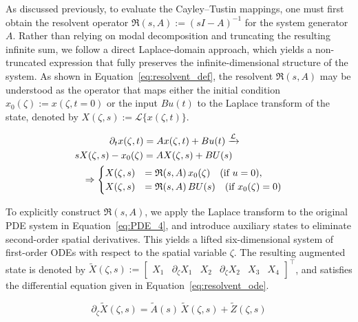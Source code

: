As discussed previously, to evaluate the Cayley--Tustin mappings, one must first obtain the resolvent operator $\mathfrak{R}(s, A) := (sI - A)^{-1}$ for the system generator $A$. Rather than relying on modal decomposition and truncating the resulting infinite sum, we follow a direct Laplace-domain approach\autocite{Khatibi2021Model, Moadeli2025Model}, which yields a non-truncated expression that fully preserves the infinite-dimensional structure of the system. As shown in Equation~\eqref{eq:resolvent_def}, the resolvent $\mathfrak{R}(s, A)$ may be understood as the operator that maps either the initial condition $x_0(\zeta) := x(\zeta, t=0)$ or the input $B u(t)$ to the Laplace transform of the state, denoted by $X(\zeta, s) := \mathcal{L}\{x(\zeta, t)\}$.


\begin{equation} \label{eq:resolvent_def}
\begin{aligned}
    &\hspace{3.6em}\partial_t x(\zeta, t) = A x(\zeta, t) + B u(t) \xrightarrow{\mathcal{L}} \\
    &s X(\zeta, s) - x_0(\zeta) = A X(\zeta, s) + B U(s) \\
    &\hspace{0.8em}\Rightarrow \begin{cases}
        X(\zeta, s) &= \mathfrak{R}(s, A)\, x_0(\zeta) \quad \text{(if $u = 0$)}, \\
        X(\zeta, s) &= \mathfrak{R}(s, A)\, B U(s) \quad \text{(if $x_0(\zeta) = 0$)}
    \end{cases}
\end{aligned}
\end{equation}

To explicitly construct $\mathfrak{R}(s, A)$, we apply the Laplace transform to the original PDE system in Equation~\eqref{eq:PDE_4}, and introduce auxiliary states to eliminate second-order spatial derivatives. This yields a lifted six-dimensional system of first-order ODEs with respect to the spatial variable $\zeta$. The resulting augmented state is denoted by $\tilde{X}(\zeta, s) := \begin{bmatrix} X_1 & \partial_\zeta X_1 & X_2 & \partial_\zeta X_2 & X_3 & X_4 \end{bmatrix}^\top$, and satisfies the differential equation given in Equation~\eqref{eq:resolvent_ode}.

\begin{equation} \label{eq:resolvent_ode}
    \partial_\zeta \tilde{X}(\zeta, s) = \tilde{A}(s)\, \tilde{X}(\zeta, s) + \tilde{Z}(\zeta, s)
\end{equation}

